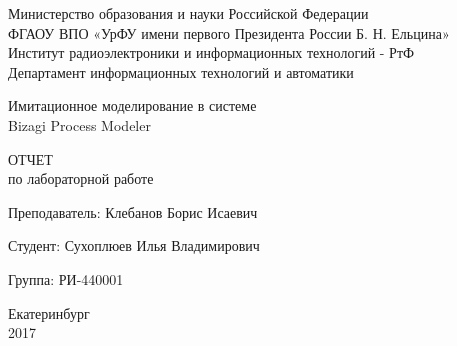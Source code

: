 \begin{center}
    Министерство образования и науки Российской Федерации\\
    ФГАОУ ВПО  «УрФУ имени первого Президента России Б. Н. Ельцина»\\
    Институт радиоэлектроники и информационных технологий - РтФ\\
    Департамент информационных технологий и автоматики
    \par
    \vspace{4.5cm}
    \Large{
      Имитационное моделирование в системе \\
      Bizagi Process Modeler

      \par
      \vspace{0.5cm}

      ОТЧЕТ\\
      по лабораторной работе
    }

    \vspace{4cm}
    {
      Преподаватель: \hfill Клебанов Борис Исаевич
    }
    \par
    {
      Студент: \hfill Сухоплюев Илья Владимирович
    }
    \par
    {
      Группа: \hfill РИ-440001
    }

    \par
    \vspace{3.5cm}
    Екатеринбург\\
    2017
\end{center}
